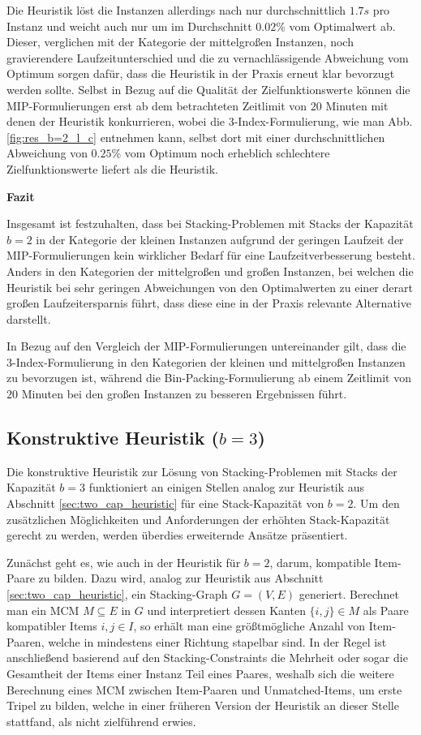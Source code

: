 Die Heuristik löst die Instanzen allerdings nach nur durchschnittlich $1.7s$ pro Instanz und weicht auch nur um im Durchschnitt $0.02 \%$ vom Optimalwert ab. Dieser, verglichen mit der Kategorie der mittelgroßen Instanzen, noch gravierendere Laufzeitunterschied und die zu vernachlässigende Abweichung vom Optimum sorgen dafür, dass die Heuristik in der Praxis erneut klar bevorzugt werden sollte. Selbst in Bezug auf die Qualität der Zielfunktionswerte können die MIP-Formulierungen erst ab dem betrachteten Zeitlimit von $20$ Minuten mit denen der Heuristik konkurrieren, wobei die 3-Index-Formulierung, wie man Abb. \ref{fig:res_b=2_l_c} entnehmen kann, selbst dort mit einer durchschnittlichen Abweichung von $0.25 \%$ vom Optimum noch erheblich schlechtere Zielfunktionswerte liefert als die Heuristik.

\textbf{Fazit}

Insgesamt ist festzuhalten, dass bei Stacking-Problemen mit Stacks der Kapazität $b = 2$ in der Kategorie der kleinen Instanzen aufgrund der geringen Laufzeit der MIP-Formulierungen kein wirklicher Bedarf für eine Laufzeitverbesserung besteht. Anders in den Kategorien der mittelgroßen und großen Instanzen, bei welchen die Heuristik bei sehr geringen Abweichungen von den Optimalwerten zu einer derart großen Laufzeitersparnis führt, dass diese eine in der Praxis relevante Alternative darstellt.

In Bezug auf den Vergleich der MIP-Formulierungen untereinander gilt, dass die 3-Index-Formulierung in den Kategorien
der kleinen und mittelgroßen Instanzen zu bevorzugen ist, während die Bin-Packing-Formulierung ab einem Zeitlimit
von $20$ Minuten bei den großen Instanzen zu besseren Ergebnissen führt.

\subsection{Konstruktive Heuristik ($b = 3$)}
\label{sec:three_cap_heuristic}

Die konstruktive Heuristik zur Lösung von Stacking-Problemen mit Stacks der Kapazität $b = 3$ funktioniert
an einigen Stellen analog zur Heuristik aus Abschnitt \ref{sec:two_cap_heuristic} für eine Stack-Kapazität von $b = 2$.
Um den zusätzlichen Möglichkeiten und Anforderungen der erhöhten Stack-Kapazität gerecht zu werden, werden überdies
erweiternde Ansätze präsentiert.

Zunächst geht es, wie auch in der Heuristik für $b = 2$, darum, kompatible Item-Paare zu bilden.
Dazu wird, analog zur Heuristik aus Abschnitt \ref{sec:two_cap_heuristic}, ein Stacking-Graph $G = (V, E)$ generiert.
Berechnet man ein \textsc{MCM} $M \subseteq E$ in $G$ und interpretiert dessen Kanten $\{i, j\} \in M$ als Paare kompatibler Items $i, j \in I$, so erhält man eine größtmögliche Anzahl von Item-Paaren, welche in mindestens einer Richtung stapelbar sind.
In der Regel ist anschließend basierend auf den Stacking-Constraints die Mehrheit oder sogar die Gesamtheit der Items einer Instanz Teil eines Paares, weshalb sich die weitere Berechnung eines \textsc{MCM} zwischen Item-Paaren und Unmatched-Items,
um erste Tripel zu bilden, welche in einer früheren Version der Heuristik an dieser Stelle stattfand, als nicht zielführend
erwies.

